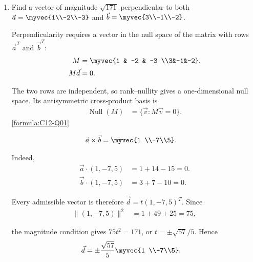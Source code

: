 \begin{enumerate}[label=\thesubsection.\arabic*, ref=\thesubsection.\theenumi]
    \item
    \label{question:C12-Q01}
    \label{question-short:C12-Q01} Find a vector of magnitude $\sqrt{171}$ perpendicular to both $\vec a=\myvec{1\\-2\\-3}$ and $\vec b=\myvec{3\\-1\\-2}$.

    \par
    \smallskip
    \solution

    Perpendicularity requires a vector in the null space of the matrix with rows $\vec a^T$ and $\vec b^T$:
    \begin{align*}
        M       & =\myvec{1 & -2 & -3 \\3&-1&-2}. \\
        M\vec d & =0.
    \end{align*}

    The two rows are independent, so rank--nullity gives a one-dimensional null space. Its antisymmetric cross-product basis is
    \begin{align*}
        \operatorname{Null}(M) & =\{\vec v:M\vec v=0\}.
    \end{align*}
    \hfill\eqref{formula:C12-Q01}

    \par
    \begin{align*}
        \vec a\times\vec b & =\myvec{1 \\-7\\5}.
    \end{align*}

    Indeed,
    \begin{align*}
        \vec a\cdot(1,-7,5) & =1+14-15=0. \\
        \vec b\cdot(1,-7,5) & =3+7-10=0.
    \end{align*}

    Every admissible vector is therefore $\vec d=t(1,-7,5)^T$. Since
    \begin{align*}
        \|(1,-7,5)\|^2 & =1+49+25=75,
    \end{align*}

    the magnitude condition gives $75t^2=171$, or $t=\pm\sqrt{57}/5$. Hence
    \begin{align*}
        \vec d & =\pm\frac{\sqrt{57}}5\myvec{1 \\-7\\5}.
    \end{align*}


\end{enumerate}
